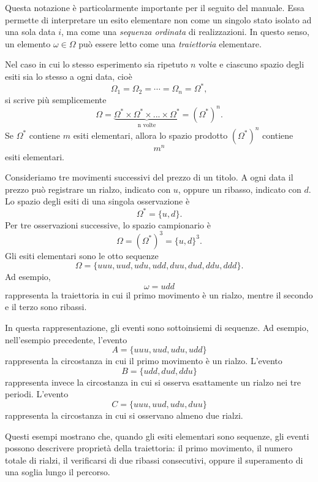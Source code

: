 Questa notazione \`{e} particolarmente importante per il seguito del manuale.
Essa permette di interpretare un esito elementare non come un singolo stato
isolato ad una sola data $i$, ma come una \textit{sequenza ordinata} di
realizzazioni. In questo senso, un elemento $\omega\in\Omega$ pu\`{o} essere
letto come una \textit{traiettoria} elementare.

Nel caso in cui lo stesso esperimento sia ripetuto $n$ volte e ciascuno spazio
degli esiti sia lo stesso a ogni data, cio\`{e}
\[
\Omega_{1}=\Omega_{2}=\cdots=\Omega_{n}=\Omega^{\ast},
\]
si scrive pi\`{u} semplicemente
\[
\Omega=\underset{\text{n volte}}{\underbrace{\Omega^{\ast}\times\Omega^{\ast
}\times...\times\Omega^{\ast}}}=(\Omega^{\ast})^{n}.
\]
Se $\Omega^{\ast}$ contiene $m$ esiti elementari, allora lo spazio prodotto
$(\Omega^{\ast})^{n}$ contiene
\[
m^{n}%
\]
esiti elementari.

\begin{example}
Consideriamo tre movimenti successivi del prezzo di un titolo. A ogni data il
prezzo pu\`{o} registrare un rialzo, indicato con $u$, oppure un ribasso,
indicato con $d$. Lo spazio degli esiti di una singola osservazione \`{e}
\[
\Omega^{\ast}=\{u,d\}.
\]
Per tre osservazioni successive, lo spazio campionario \`{e}
\[
\Omega=(\Omega^{\ast})^{3}=\{u,d\}^{3}.
\]
Gli esiti elementari sono le otto sequenze
\[
\Omega=\{uuu,uud,udu,udd,duu,dud,ddu,ddd\}.
\]
Ad esempio,
\[
\omega=udd
\]
rappresenta la traiettoria in cui il primo movimento \`{e} un rialzo, mentre
il secondo e il terzo sono ribassi.
\end{example}

In questa rappresentazione, gli eventi sono sottoinsiemi di sequenze. Ad
esempio, nell'esempio precedente, l'evento
\[
A=\{uuu,uud,udu,udd\}
\]
rappresenta la circostanza in cui il primo movimento \`{e} un rialzo.
L'evento
\[
B=\{udd,dud,ddu\}
\]
rappresenta invece la circostanza in cui si osserva esattamente un rialzo nei
tre periodi. L'evento
\[
C=\{uuu,uud,udu,duu\}
\]
rappresenta la circostanza in cui si osservano almeno due rialzi.

Questi esempi mostrano che, quando gli esiti elementari sono sequenze, gli
eventi possono descrivere propriet\`{a} della traiettoria: il primo movimento,
il numero totale di rialzi, il verificarsi di due ribassi consecutivi, oppure
il superamento di una soglia lungo il percorso.

